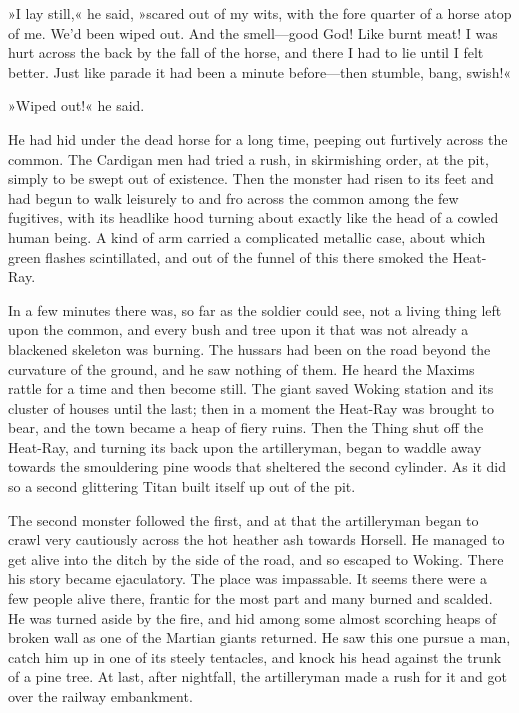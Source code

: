 »I lay still,« he said, »scared out of my wits, with the fore quarter of a horse atop of me. We'd been wiped out. And the smell—good God! Like burnt meat! I was hurt across the back by the fall of the horse, and there I had to lie until I felt better. Just like parade it had been a minute before—then stumble, bang, swish!«

»Wiped out!« he said.

He had hid under the dead horse for a long time, peeping out furtively across the common. The Cardigan men had tried a rush, in skirmishing order, at the pit, simply to be swept out of existence. Then the monster had risen to its feet and had begun to walk leisurely to and fro across the common among the few fugitives, with its headlike hood turning about exactly like the head of a cowled human being. A kind of arm carried a complicated metallic case, about which green flashes scintillated, and out of the funnel of this there smoked the Heat-Ray.

In a few minutes there was, so far as the soldier could see, not a living thing left upon the common, and every bush and tree upon it that was not already a blackened skeleton was burning. The hussars had been on the road beyond the curvature of the ground, and he saw nothing of them. He heard the Maxims rattle for a time and then become still. The giant saved Woking station and its cluster of houses until the last; then in a moment the Heat-Ray was brought to bear, and the town became a heap of fiery ruins. Then the Thing shut off the Heat-Ray, and turning its back upon the artilleryman, began to waddle away towards the smouldering pine woods that sheltered the second cylinder. As it did so a second glittering Titan built itself up out of the pit.

The second monster followed the first, and at that the artilleryman began to crawl very cautiously across the hot heather ash towards Horsell. He managed to get alive into the ditch by the side of the road, and so escaped to Woking. There his story became ejaculatory. The place was impassable. It seems there were a few people alive there, frantic for the most part and many burned and scalded. He was turned aside by the fire, and hid among some almost scorching heaps of broken wall as one of the Martian giants returned. He saw this one pursue a man, catch him up in one of its steely tentacles, and knock his head against the trunk of a pine tree. At last, after nightfall, the artilleryman made a rush for it and got over the railway embankment.

